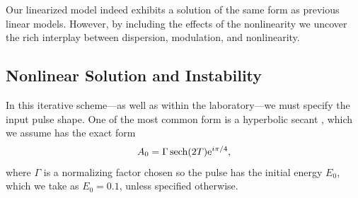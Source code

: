 \documentclass[9pt,twocolumn,twoside]{osajnl}
\let\originalleft\left
\let\originalright\right
\renewcommand{\left}{\mathopen{}\mathclose\bgroup\originalleft}
\renewcommand{\right}{\aftergroup\egroup\originalright}
\DeclareMathOperator{\sech}{sech}
\begin{document}
Our linearized model indeed exhibits a solution of the same form as previous linear models. However, by including the effects of the nonlinearity we uncover the rich interplay between dispersion, modulation, and nonlinearity.

\subsection{Nonlinear Solution and Instability}
\label{sec:nlresults}
In this iterative scheme---as well as within the laboratory---we must specify the input pulse shape. One of the most common form is a hyperbolic secant \cite{coen1997, finot2008, mitschke1986, rothenberg1989b, tomlinson1984}, which we assume has the exact form
\begin{align}
	A_0 = \Gamma \sech \left( 2 T \right) \textrm{e}^{i \pi / 4},
	\label{eq:nlA0}
\end{align}
where $\Gamma$ is a normalizing factor chosen so the pulse has the initial energy $E_0$, which we take as $E_0 = 0.1$, unless specified otherwise.
\end{document}
